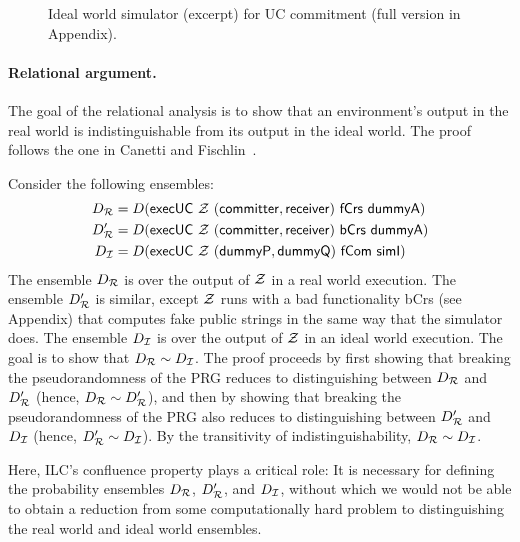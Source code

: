 \begin{figure}

\caption{Ideal world simulator (excerpt) for UC commitment (full version in Appendix).}
\label{fig:sim-short}
\end{figure}


\paragraph{Relational argument.}
The goal of the relational analysis is to show that an environment's output in
the real world is indistinguishable from its output in the ideal world. The
proof follows the one in Canetti and Fischlin~\cite{canetti2001commitments}.

\begin{sketch}
  Consider the following ensembles:
  \begin{align*}
    D_{\mathcal{{R}}} &= D(\mathsf{execUC~\mathcal{{Z}}~(committer, receiver)~fCrs~dummyA})\\
    D_{\mathcal{{R}}}' &= D(\mathsf{execUC~\mathcal{{Z}}~(committer, receiver)~bCrs~dummyA})\\
    D_{\mathcal{{I}}} &= D(\mathsf{execUC~\mathcal{{Z}}~(dummyP, dummyQ)~fCom~simI})
  \end{align*}
  \noindent The ensemble $D_{\mathcal{{R}}}$ is over the output of $\mathcal{{Z}}$ in a real
  world execution. The ensemble $D_{\mathcal{{R}}}'$ is similar, except $\mathcal{{Z}}$ runs
  with a bad functionality \textsf{bCrs} (see Appendix) that computes fake
  public strings in the same way that the simulator does. The ensemble
  $D_{\mathcal{{I}}}$ is over the output of $\mathcal{{Z}}$ in an ideal world execution. The
  goal is to show that $D_{\mathcal{{R}}} \sim D_{\mathcal{{I}}}$.
%  
  The proof proceeds by first showing that breaking the pseudorandomness of the
  PRG reduces to distinguishing between $D_{\mathcal{{R}}}$ and $D_{\mathcal{{R}}}'$ (hence,
  $D_{\mathcal{{R}}} \sim D_{\mathcal{{R}}}'$), and then by showing that breaking the
  pseudorandomness of the PRG also reduces to distinguishing between
  $D_{\mathcal{{R}}}'$ and $D_{\mathcal{{I}}}$ (hence, $D_{\mathcal{{R}}}' \sim D_{\mathcal{{I}}}$). By the
  transitivity of indistinguishability, ${D_{\mathcal{{R}}} \sim D_{\mathcal{{I}}}}$.
\end{sketch}

Here, ILC's confluence property plays a critical role: It is necessary for
defining the probability ensembles $D_{\mathcal{{R}}}$, $D_{\mathcal{{R}}}'$, and
$D_{\mathcal{{I}}}$, without which we would not be able to obtain a reduction from some
computationally hard problem to distinguishing the real world and ideal world
ensembles.

